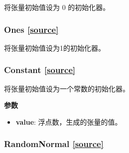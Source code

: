 \begin{Shaded}
\begin{Highlighting}[]
\end{Highlighting}
\end{Shaded}

将张量初始值设为 0 的初始化器。




\subsubsection{Ones {\href{https://github.com/keras-team/keras/blob/master/keras/initializers.py\#L41}{{[}source{]}}}}

\begin{Shaded}
\begin{Highlighting}[]
\end{Highlighting}
\end{Shaded}

将张量初始值设为1的初始化器。




\subsubsection{Constant {\href{https://github.com/keras-team/keras/blob/master/keras/initializers.py\#L49}{{[}source{]}}}}

\begin{Shaded}
\begin{Highlighting}[]
\OperatorTok{=}\NormalTok{)}
\end{Highlighting}
\end{Shaded}

将张量初始值设为一个常数的初始化器。

\textbf{参数}

\begin{itemize}
\tightlist
\item
  \textbf{value}: 浮点数，生成的张量的值。
\end{itemize}




\subsubsection{RandomNormal {\href{https://github.com/keras-team/keras/blob/master/keras/initializers.py\#L66}{{[}source{]}}}}

